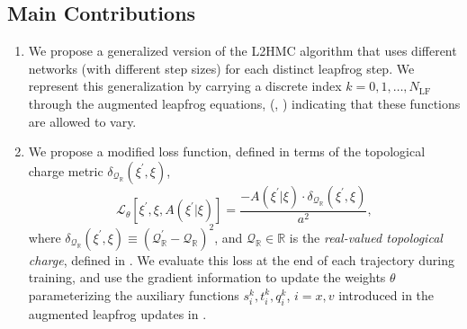 \documentclass{article} %
\begin{document}
\subsection{\label{subsec:main_contributions}Main Contributions}
\begin{enumerate}
   \item We propose a generalized version of the L2HMC algorithm that uses different networks (with different step
      sizes) for each distinct leapfrog step.
      We represent this generalization by carrying a discrete index \(k = 0, 1, \ldots, N_{\mathrm{LF}}\) through the
      augmented leapfrog equations, (, ) indicating that
      these functions are allowed to vary.
   \item We propose a modified loss function, defined in terms of the topological charge metric
      \(\delta_{\mathcal{Q}_{\mathbb{R}}}(\xi^{\prime}, \xi)\),
      \begin{equation}
         \mathcal{L}_{\theta}{\left[\xi^{\prime},\xi,A(\xi^{\prime}|\xi)\right]} =%
         \frac{-A(\xi^{\prime}|\xi)\cdot \delta_{\mathcal{Q}_{\mathbb{R}}}(\xi^{\prime},\xi)}{a^{2}},
      \end{equation}
      where \(\delta_{\mathcal{Q}_{\mathbb{R}}}(\xi^{\prime}, \xi) \equiv
      {\left(\mathcal{Q}_{\mathbb{R}}^{\prime}-\mathcal{Q}_{\mathbb{R}}\right)}^{2}\), and
      \(\mathcal{Q}_{\mathbb{R}}\in\mathbb{R}\) is the \emph{real-valued topological charge}, defined in
      .
      We evaluate this loss at the end of each trajectory during training, and use the gradient information to update
      the weights \(\theta\) parameterizing the auxiliary functions \(s^{k}_{i}, t^{k}_{i}, q^{k}_{i}\), \(i = x, v\)
      introduced in the augmented leapfrog updates in .

\end{enumerate}
\end{document}
